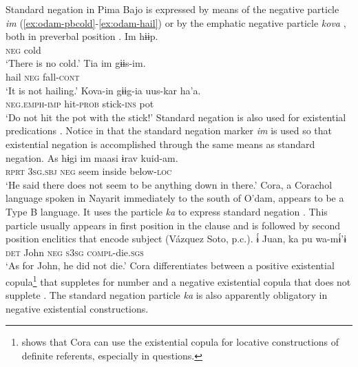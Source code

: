 \documentclass[output=paper,draft,draftmode,colorlinks,citecolor=brown]{langscibook}
\begin{document}
Standard negation in Pima Bajo is expressed by means of the negative particle \emph{im} (\ref{ex:odam-pbcold}-\ref{ex:odam-hail}) or by the emphatic negative particle \emph{kova} , both in preverbal position \citep{estrada2014}. 
\ea
\label{ex:odam-pbcold}
\gll Im 	hɨɨp.\\
\textsc{neg} 	cold\\
\glt ‘There is no cold.’ \citep[162]{estrada2014}
\z 
\ea
\label{ex:odam-hail}
\gll Tia 		im 	gɨɨs-im.\\
hail 	\textsc{neg} 	fall-\textsc{cont}\\
\glt ‘It is not hailing.’ \citep[163]{estrada2014}		
\z 
\ea
\label{ex:odam-kovain}
\gll Kova-in 	gɨɨg-ia 	uus-kar	ha’a.\\
\textsc{neg.emph-imp} 	hit-\textsc{prob} 	stick-\textsc{ins} pot\\
\glt ‘Do not hit the pot with the stick!’ \citep[132]{estrada2014}
\z 		
Standard negation is also used for existential predications \citep[155]{estrada2014}. Notice in  that the standard negation marker \emph{im} is used so that existential negation is accomplished through the same means as standard negation.
\ea
\label{ex:odam-pbnoseem}
\gll As hɨgi im maasi ɨrav kuid-am.\\
\textsc{rprt} \textsc{3sg.sbj} \textsc{neg} seem inside below-\textsc{loc}\\
\glt `He said there does not seem to be anything down in there.' \citep[155]{estrada2014}
\z
Cora, a Corachol language spoken in Nayarit immediately to the south of O’dam, appears to be a Type B language. It uses the particle \emph{ka} to express standard negation . This particle usually appears in first position in the clause and is followed by second position enclitics that encode subject (Vázquez Soto, p.c.).
\ea
\label{ex:odam-pbeat}
\gll ɨ́ Juan, ka pu wa-mɨ́'ɨ\\
\textsc{det} John \textsc{neg} \textsc{s3sg} \textsc{compl}-die.\textsc{sgs}\\
\glt `As for John, he did not die.' \citep[201]{vasquez2001}
\z 
Cora differentiates between a positive  existential copula\footnote{\citet{vazquez2013} shows that Cora can use the existential copula for locative constructions of definite referents, especially in questions.} that suppletes for number and a negative existential copula that does not supplete . The standard negation particle \emph{ka} is also apparently obligatory in negative existential constructions.
\end{document}
